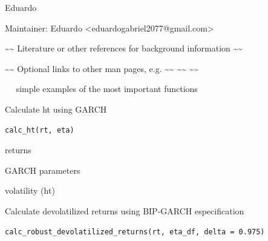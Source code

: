 \documentclass[letterpaper]{book}
\begin{document}
%
\begin{Author}
Eduardo

Maintainer: Eduardo <eduardogabriel2077@gmail.com>
\end{Author}
%
\begin{References}
\textasciitilde{}\textasciitilde{} Literature or other references for background information \textasciitilde{}\textasciitilde{}
\end{References}
%
\begin{SeeAlso}
\textasciitilde{}\textasciitilde{} Optional links to other man pages, e.g. \textasciitilde{}\textasciitilde{}
\textasciitilde{}\textasciitilde{}  \textasciitilde{}\textasciitilde{}
\end{SeeAlso}
%
\begin{Examples}
\begin{ExampleCode}
~~ simple examples of the most important functions ~~
\end{ExampleCode}
\end{Examples}
%
\begin{Description}
Calculate ht using GARCH
\end{Description}
%
\begin{Usage}
\begin{verbatim}
calc_ht(rt, eta)
\end{verbatim}
\end{Usage}
%
\begin{Arguments}
\begin{ldescription}
\item[\code{rt}] returns

\item[\code{eta}] GARCH parameters
\end{ldescription}
\end{Arguments}
%
\begin{Value}
volatility (ht)
\end{Value}
%
\begin{Description}
Calculate devolatilized returns using BIP-GARCH especification
\end{Description}
%
\begin{Usage}
\begin{verbatim}
calc_robust_devolatilized_returns(rt, eta_df, delta = 0.975)
\end{verbatim}
\end{Usage}
\end{document}
